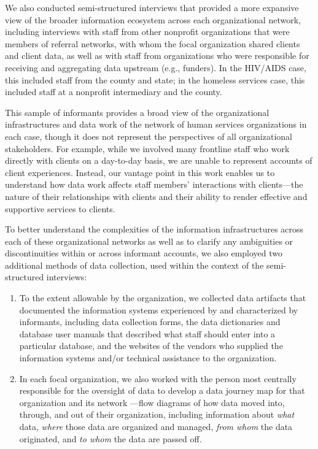 We also conducted semi-structured interviews that provided a more expansive view of the broader information ecosystem across each organizational network, including interviews with staff from other nonprofit organizations that were members of referral networks, with whom the focal organization shared clients and client data, as well as with staff from organizations who were responsible for receiving and aggregating data upstream (e.g., funders). In the HIV/AIDS case, this included staff from the county and state; in the homeless services case, this included staff at a nonprofit intermediary and the county.  

This sample of informants provides a broad view of the organizational infrastructures and data work of the network of human services organizations in each case, though it does not represent the perspectives of all organizational stakeholders. For example, while we involved many frontline staff who work directly with clients on a day-to-day basis, we are unable to represent accounts of client experiences. Instead, our vantage point in this work enables us to understand how data work affects staff members' interactions with clients---the nature of their relationships with clients and their ability to render effective and supportive services to clients. 

To better understand the complexities of the information infrastructures across each of these organizational networks as well as to clarify any ambiguities or discontinuities within or across informant accounts, we also employed two additional methods of data collection, used within the context of the semi-structured interviews:
\begin{enumerate}
\item To the extent allowable by the organization, we collected data artifacts that documented the information systems experienced by and characterized by informants, including data collection forms, the data dictionaries and database user manuals that described what staff should enter into a particular database, and the websites of the vendors who supplied the information systems and/or technical assistance to the organization.
\item In each focal organization, we also worked with the person most centrally responsible for the oversight of data to develop a data journey map for that organization and its network \citep{Bates2016Journeys}---flow diagrams of how data moved into, through, and out of their organization, including information about \textit{what} data, \textit{where} those data are organized and managed, \textit{from whom} the data originated, and \textit{to whom} the data are passed off.
\end{enumerate}


